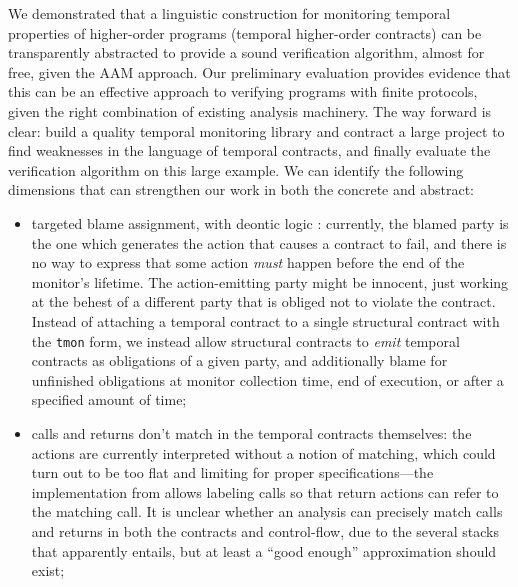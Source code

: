 We demonstrated that a linguistic construction for monitoring temporal properties of higher-order programs (temporal higher-order contracts) can be transparently abstracted to provide a sound verification algorithm, almost for free, given the AAM approach.
%
Our preliminary evaluation provides evidence that this can be an effective approach to verifying programs with finite protocols, given the right combination of existing analysis machinery.
%
The way forward is clear: build a quality temporal monitoring library and contract a large project to find weaknesses in the language of temporal contracts, and finally evaluate the verification algorithm on this large example.
%
We can identify the following dimensions that can strengthen our work in both the concrete and abstract:
\begin{itemize}
\item{targeted blame assignment, with deontic logic \citep{ianjohnson:DBLP:conf/dagstuhl/MeyerWD98}:
%
currently, the blamed party is the one which generates the action that causes a contract to fail, and there is no way to express that some action \emph{must} happen before the end of the monitor's lifetime.
%
The action-emitting party might be innocent, just working at the behest of a different party that is obliged not to violate the contract.
%
Instead of attaching a temporal contract to a single structural contract with the {\tt tmon} form, we instead allow structural contracts to \emph{emit} temporal contracts as obligations of a given party, and additionally blame for unfinished obligations at monitor collection time, end of execution, or after a specified amount of time;
}
%
\item{calls and returns don't match in the temporal contracts themselves:
%
the actions are currently interpreted without a notion of matching, which could turn out to be too flat and limiting for proper specifications---the implementation from \dfm{} allows labeling calls so that return actions can refer to the matching call.
%
It is unclear whether an analysis can precisely match calls and returns in both the contracts and control-flow, due to the several stacks that apparently entails, but at least a ``good enough'' approximation should exist;
}
%
\end{itemize}
